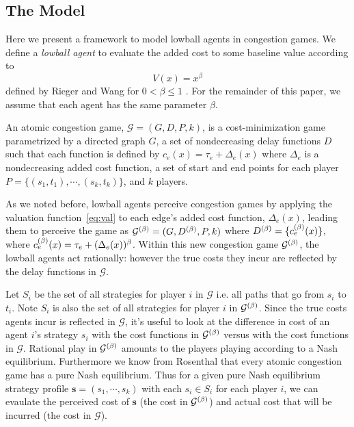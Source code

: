 \documentclass[twoside]{article}
\begin{document}
\begin{multicols}{2}
\section{The Model}

Here we present a framework to model lowball agents in congestion games. We define a 
\textit{lowball agent} to evaluate the added cost to some baseline value according to
\begin{equation}
  V(x) = x^{\beta}
  \label{eq:val}
\end{equation}
defined by Rieger and Wang for $0 < \beta \le 1$ \cite{Rieger2008}. For the
remainder of this paper, we assume that each agent has the same parameter
$\beta$.

An atomic congestion game, $\mathcal{G} = (G, D, P, k)$, is a cost-minimization
game parametrized by a directed graph $G$, a set of nondecreasing delay
functions $D$ such that each function is defined by $c_e(x) = \tau_e + \Delta_e(x)$ where $\Delta_e$ is a nondecreasing added cost function, a set of start and end
points for each player $P =\{(s_1, t_1), \cdots, (s_k, t_k)\}$, and $k$ players.

As we noted before, lowball agents perceive congestion games by applying the valuation
function~\eqref{eq:val} to each edge's added cost function, $\Delta_e(x)$, leading them to
perceive the game as $\mathcal{G}^{(\beta)}= (G, D^{(\beta)}, P, k)$ where $D^{(\beta)} =
\{c_e^{(\beta)}(x)\}$, where $c_e^{(\beta)}(x) = \tau_e + (\Delta_e(x))^\beta$. Within this new
congestion game $\mathcal{G}^{(\beta)}$, the lowball agents act rationally: however
the true costs they incur are reflected by the delay functions in $\mathcal{G}$.   

Let $S_i$ be the set of all strategies for player $i$ in $\mathcal{G}$ i.e. all
paths that go from $s_i$ to $t_i$.  Note $S_i$ is also the set of all strategies for
player $i$ in $\mathcal{G}^{(\beta)}$.  Since the true costs agents incur is
reflected in $\mathcal{G}$, it's useful to look at the difference in cost of an
agent $i$'s strategy $s_i$ with the
cost functions in $\mathcal{G}^{(\beta)}$ versus with the cost functions in $\mathcal{G}$.
Rational play in $\mathcal{G}^{(\beta)}$ amounts to the players playing according to
a Nash equilibrium.  Furthermore we know from Rosenthal \cite{Rosenthal1973}
that every atomic congestion game has a pure Nash equilibrium.  Thus for a given
pure Nash equilibrium strategy profile $\mathbf{s} = (s_1, \cdots, s_k)$ with
each $s_i \in S_i$ for each player $i$, we can evaulate the perceived cost of
$\mathbf{s}$ (the cost in $\mathcal{G}^{(\beta)}$) and actual cost that will be
incurred (the cost in $\mathcal{G}$).


\end{multicols}
\end{document}
